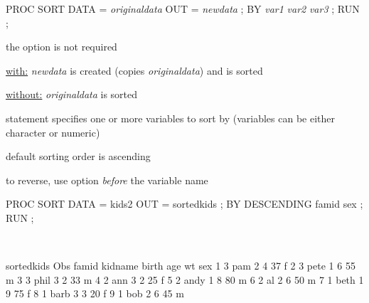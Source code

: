 \begin{frame}[fragile]
\footnotesize
\begin{code}{.0}
PROC SORT DATA = \emph{originaldata} OUT = \emph{newdata} ;
    BY \emph{var1} \emph{var2} \emph{var3} ;
RUN ;
\end{code}
\emp
\vskip10pt
\bi
\item the  option is not required
\bi
\item \underline{with:} \emph{newdata} is created (copies \emph{originaldata}) and is sorted
\item \underline{without:} \emph{originaldata} is sorted
\ei
\item {} statement specifies one or more variables to sort by (variables can be either character or numeric)
\bi
\item default sorting order is ascending
\item to reverse, use  option \emph{before} the variable name
\ei
\ei
\end{frame}

\begin{frame}[fragile]
\footnotesize
\begin{code}{.0}
PROC SORT DATA = kids2 OUT = sortedkids ;
   BY DESCENDING famid sex ;
RUN ;
\end{code}
\emp\\
 \hspace{0.05in} \emp
{}
\begin{craw}{.0}{sortedkids}
Obs famid kidname birth age wt sex
 1    3    pam      2    4  37  f
 2    3    pete     1    6  55  m
 3    3    phil     3    2  33  m
 4    2    ann      3    2  25  f
 5    2    andy     1    8  80  m
 6    2    al       2    6  50  m
 7    1    beth     1    9  75  f
 8    1    barb     3    3  20  f
 9    1    bob      2    6  45  m
\end{craw}
\emp
\end{frame}


